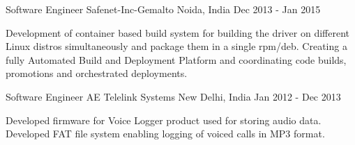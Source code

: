 \begin{cventries}
  \cventry
    {Software Engineer}
    {Safenet-Inc-Gemalto}
    {Noida, India}
    {Dec 2013 - Jan 2015}
    {
      \begin{cvitems}
        \item {Development of container based build system for building the driver on different Linux distros simultaneously and package them in a single rpm/deb. Creating a fully Automated Build and Deployment Platform and coordinating code builds, promotions and orchestrated deployments.}
      \end{cvitems}
    }	  
	  
  \cventry
    {Software Engineer}
    {AE Telelink Systems}
    {New Delhi, India}
    {Jan 2012 - Dec 2013}
    {
      \begin{cvitems}
        \item {Developed firmware for Voice Logger product used for storing audio data. Developed FAT file system enabling logging of voiced calls in MP3 format.}
      \end{cvitems}
    }  
\end{cventries}
